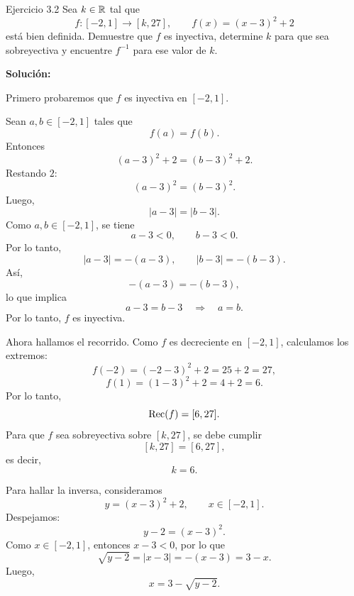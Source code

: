 \documentclass[letterpaper, 12pt]{article}
\begin{document}
\begin{solucionbox}{Ejercicio 3.2}
Sea $k\in\mathbb{R}$ tal que
\[
    f:[-2,1]\to[k,27],
    \qquad
    f(x)=(x-3)^2+2
\]
est\'a bien definida. Demuestre que $f$ es inyectiva, determine $k$ para que sea sobreyectiva y encuentre $f^{-1}$ para ese valor de $k$.

\textbf{Soluci\'on:}

Primero probaremos que $f$ es inyectiva en $[-2,1]$.

Sean $a,b\in[-2,1]$ tales que
\[
    f(a)=f(b).
\]
Entonces
\[
    (a-3)^2+2=(b-3)^2+2.
\]
Restando $2$:
\[
    (a-3)^2=(b-3)^2.
\]
Luego,
\[
    |a-3|=|b-3|.
\]
Como $a,b\in[-2,1]$, se tiene
\[
    a-3<0,\qquad b-3<0.
\]
Por lo tanto,
\[
    |a-3|=-(a-3),\qquad |b-3|=-(b-3).
\]
As\'i,
\[
    -(a-3)=-(b-3),
\]
lo que implica
\[
    a-3=b-3
    \quad\Longrightarrow\quad
    a=b.
\]
Por lo tanto, $f$ es inyectiva.

Ahora hallamos el recorrido. Como $f$ es decreciente en $[-2,1]$, calculamos los extremos:
\[
    f(-2)=(-2-3)^2+2=25+2=27,
\]
\[
    f(1)=(1-3)^2+2=4+2=6.
\]
Por lo tanto,
\[
    \operatorname{Rec}(f)=[6,27].
\]
Para que $f$ sea sobreyectiva sobre $[k,27]$, se debe cumplir
\[
    [k,27]=[6,27],
\]
es decir,
\[
    k=6.
\]

Para hallar la inversa, consideramos
\[
    y=(x-3)^2+2,
    \qquad x\in[-2,1].
\]
Despejamos:
\[
    y-2=(x-3)^2.
\]
Como $x\in[-2,1]$, entonces $x-3<0$, por lo que
\[
    \sqrt{y-2}=|x-3|=-(x-3)=3-x.
\]
Luego,
\[
    x=3-\sqrt{y-2}.
\]

\end{solucionbox}
\end{document}
